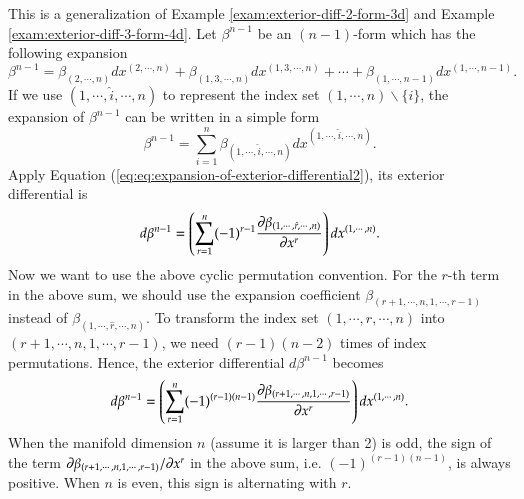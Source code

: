 \documentclass[11pt, a4paper]{book}
\begin{document}
\begin{Example}
  This is a generalization of Example \ref{exam:exterior-diff-2-form-3d} and Example
  \ref{exam:exterior-diff-3-form-4d}. Let $\beta^{n-1}$ be an $(n-1)$-form which has the
  following expansion
  \begin{equation}
    \beta^{n-1} = \beta_{(2, \cdots, n)} dx^{(2, \cdots, n)} +
    \beta_{(1,3,\cdots,n)} dx^{(1,3,\cdots,n)} + \cdots + \beta_{(1,\cdots,n-1)}
    dx^{(1,\cdots,n-1)}.
  \end{equation}
  If we use $(1,\cdots,\hat{i},\cdots,n)$ to represent the index set
  $(1,\cdots,n)\backslash \{i\}$, the expansion of $\beta^{n-1}$ can be written in a
  simple form
  \begin{equation}
    \beta^{n-1} = \sum_{i=1}^{n} \beta_{(1,\cdots,\hat{i},\cdots,n)} dx^{(1,\cdots,\hat{i},\cdots,n)}.
  \end{equation}
  Apply Equation (\ref{eq:eq:expansion-of-exterior-differential2}), its exterior
  differential is
  \begin{equation}
    d\beta^{n-1} = \left( \sum_{r=1}^n (-1)^{r-1} \frac{\partial
        \beta_{(1,\cdots,\hat{r},\cdots,n)}}{\partial x^r}
    \right) dx^{(1,\cdots,n)}.
  \end{equation}
  Now we want to use the above cyclic permutation convention. For the $r$-th term in the
  above sum, we should use the expansion coefficient $\beta_{(r+1,\cdots,n,1,\cdots,r-1)}$
  instead of $\beta_{(1,\cdots,\hat{r},\cdots,n)}$. To transform the index set
  $(1,\cdots,\hat{r},\cdots,n)$ into $(r+1,\cdots,n,1,\cdots,r-1)$, we need $(r-1)(n-2)$
  times of index permutations. Hence, the exterior differential $d\beta^{n-1}$ becomes
  \begin{equation}
    d\beta^{n-1} = \left( \sum_{r=1}^n (-1)^{(r-1)(n-1)} \frac{\partial
        \beta_{(r+1,\cdots,n,1,\cdots,r-1)}}{\partial x^r}
    \right) dx^{(1,\cdots,n)}.
  \end{equation}
  When the manifold dimension $n$ (assume it is larger than 2) is odd, the sign of the
  term $\partial \beta_{(r+1,\cdots,n,1,\cdots,r-1)}/\partial x^r$ in the above sum, i.e.
  $(-1)^{(r-1)(n-1)}$, is always positive. When $n$ is even, this sign is alternating with
  $r$.
\end{Example}
\end{document}

